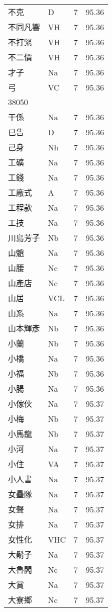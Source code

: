 \documentclass[twocolumn]{book}
\begin{document}
\begin{supertabular}{llrr}
不克 & D & 7 &  95.36\\
不同凡響 & VH & 7 &  95.36\\
不打緊 & VH & 7 &  95.36\\
不二價 & VH & 7 &  95.36\\
才子 & Na & 7 &  95.36\\
弓 & VC & 7 &  95.36\\
38050\\
干係 & Na & 7 &  95.36\\
已告 & D & 7 &  95.36\\
己身 & Nh & 7 &  95.36\\
工礦 & Na & 7 &  95.36\\
工錢 & Na & 7 &  95.36\\
工廠式 & A & 7 &  95.36\\
工程款 & Na & 7 &  95.36\\
工技 & Na & 7 &  95.36\\
川島芳子 & Nb & 7 &  95.36\\
山魈 & Na & 7 &  95.36\\
山腰 & Nc & 7 &  95.36\\
山產店 & Nc & 7 &  95.36\\
山居 & VCL & 7 &  95.36\\
山系 & Na & 7 &  95.36\\
山本輝彥 & Nb & 7 &  95.36\\
小蘭 & Nb & 7 &  95.36\\
小橋 & Na & 7 &  95.36\\
小福 & Nb & 7 &  95.36\\
小腸 & Na & 7 &  95.36\\
小傢伙 & Na & 7 &  95.37\\
小梅 & Nb & 7 &  95.37\\
小馬龍 & Nb & 7 &  95.37\\
小河 & Na & 7 &  95.37\\
小住 & VA & 7 &  95.37\\
小人書 & Na & 7 &  95.37\\
女壘隊 & Na & 7 &  95.37\\
女聲 & Na & 7 &  95.37\\
女排 & Na & 7 &  95.37\\
女性化 & VHC & 7 &  95.37\\
大鬍子 & Na & 7 &  95.37\\
大魯閣 & Nc & 7 &  95.37\\
大賞 & Na & 7 &  95.37\\
大寮鄉 & Nc & 7 &  95.37\\

\end{supertabular}
\end{document}
